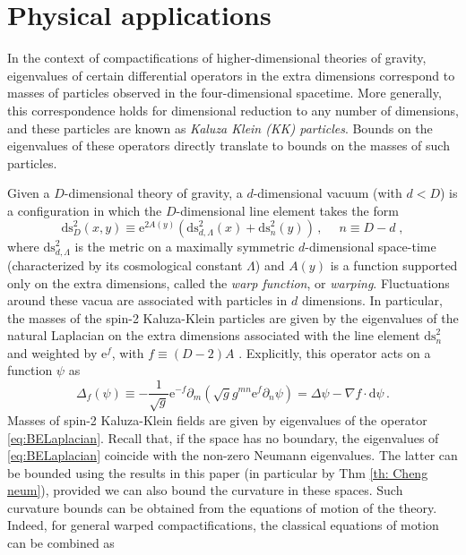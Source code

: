 \documentclass[12pt]{article}
\newcommand{\dd}{\mathrm{d}}
\newcommand{\ee}{\mathrm{e}}
\theoremstyle{plain}
\theoremstyle{definition}
\begin{document}
\section{Physical applications}\label{sec: phys}

In the context of compactifications of higher-dimensional theories of gravity, eigenvalues of certain differential operators in the extra dimensions correspond to masses of particles observed in the four-dimensional spacetime. More generally, this correspondence holds for dimensional reduction to any number of dimensions, and these particles are known as \emph{Kaluza Klein (KK) particles}. Bounds on the eigenvalues of these operators directly translate to bounds on the masses of such particles.

Given a $D$-dimensional theory of gravity, a $d$-dimensional vacuum (with $d<D$) is a configuration in which the $D$-dimensional line element takes the form
\begin{equation}
	\text{ds}^2_D (x, y) \equiv \ee^{2 A (y)}\left( \text{ds}^2_{d, \Lambda} (x) +
	\text{ds}^2_n (y) \right) \,, \quad \;n \equiv D-d\;, \label{eq:metAns}
\end{equation}
where $\text{ds}^2_{d, \Lambda}$ is the metric on a maximally symmetric $d$-dimensional space-time (characterized by its cosmological constant $\Lambda$) and $A(y)$ is a function supported only on the extra dimensions, called the \emph{warp function}, or \emph{warping}. Fluctuations around these vacua are associated with particles in $d$ dimensions. In particular, the masses of the spin-2 Kaluza-Klein particles are given by the eigenvalues of the natural Laplacian on the extra dimensions associated with the line element $\text{ds}^2_n$ and weighted by $\ee^f$, with $f \equiv (D-2)A$ \cite{bachas-estes,csaki-erlich-hollowood-shirman,deluca-t-leaps}. Explicitly, this operator acts on a function $\psi$ as
\begin{equation}\label{eq:BELaplacian}
	\Delta_f (\psi) \equiv - \frac{1}{\sqrt{g}} \ee^{- f} \partial_m
	\left( \sqrt{g}  g^{m n} \ee^f \partial_n \psi \right) = \Delta \psi-\nabla f \cdot \dd \psi\,.
\end{equation}
Masses of spin-2 Kaluza-Klein fields are given by eigenvalues of the operator \eqref{eq:BELaplacian}. Recall that, if the space has no boundary, the eigenvalues of \eqref{eq:BELaplacian} coincide with the non-zero Neumann eigenvalues. The latter can be bounded using the results in this paper (in particular by Thm \ref{th: Cheng neum}), provided we can also bound the curvature in these spaces. Such curvature bounds can be obtained from the equations of motion of the theory. Indeed, for general warped compactifications, the classical equations of motion can be combined as \cite[Sec.~2.1]{deluca-deponti-mondino-t-entropy}
\end{document}
